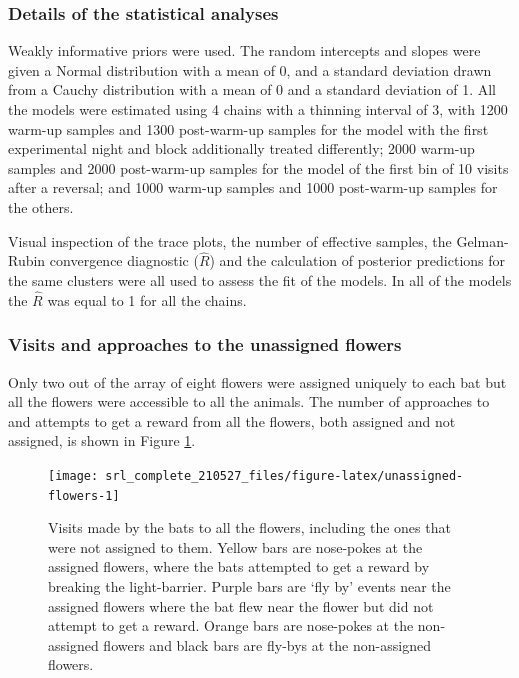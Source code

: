 \documentclass[
]{article}
\begin{document}
\hypertarget{details-of-the-statistical-analyses}{%
\subsubsection{Details of the statistical analyses}\label{details-of-the-statistical-analyses}}

Weakly informative priors were used. The random intercepts and slopes were given a Normal distribution with a mean of 0, and a standard deviation drawn from a Cauchy distribution with a mean of 0 and a standard deviation of 1. All the models were estimated using 4 chains with a thinning interval of 3, with 1200 warm-up samples and 1300 post-warm-up samples for the model with the first experimental night and block additionally treated differently; 2000 warm-up samples and 2000 post-warm-up samples for the model of the first bin of 10 visits after a reversal; and 1000 warm-up samples and 1000 post-warm-up samples for the others.

Visual inspection of the trace plots, the number of effective samples, the Gelman-Rubin convergence diagnostic (\(\hat R\)) and the calculation of posterior predictions for the same clusters were all used to assess the fit of the models. In all of the models the \(\hat R\) was equal to 1 for all the chains.

\hypertarget{visits-and-approaches-to-the-unassigned-flowers}{%
\subsubsection{Visits and approaches to the unassigned flowers}\label{visits-and-approaches-to-the-unassigned-flowers}}

Only two out of the array of eight flowers were assigned uniquely to each bat but all the flowers were accessible to all the animals. The number of approaches to and attempts to get a reward from all the flowers, both assigned and not assigned, is shown in Figure \ref{fig:unassigned-flowers}.



\begin{figure}[H]

{\centering \texttt{[image: srl\_complete\_210527\_files/figure-latex/unassigned-flowers-1]} 

}

\caption{Visits made by the bats to all the flowers, including the ones that were not assigned to them. Yellow bars are nose-pokes at the assigned flowers, where the bats attempted to get a reward by breaking the light-barrier. Purple bars are `fly by' events near the assigned flowers where the bat flew near the flower but did not attempt to get a reward. Orange bars are nose-pokes at the non-assigned flowers and black bars are fly-bys at the non-assigned flowers.}\label{fig:unassigned-flowers}
\end{figure}
\end{document}
